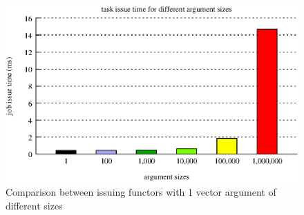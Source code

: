 \begin{figure}[!ht]
\includegraphics[width=0.7\columnwidth]{figures/job_issue_time_different_argsizes}
\caption{Comparison between issuing functors with 1 vector argument of different sizes}
\label{fig:job_issue_time_different_argsizes}
\end{figure}

